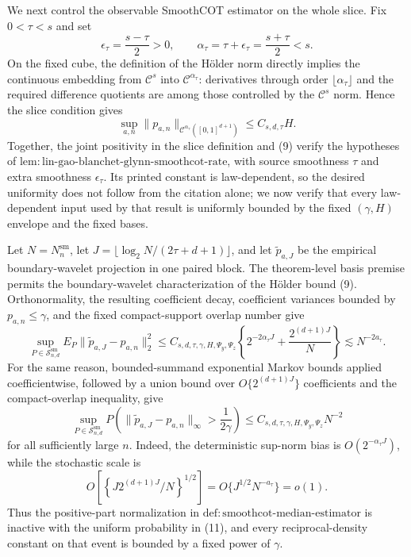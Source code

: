 We next control the observable SmoothCOT estimator on the whole slice.  Fix \(0<\tau<s\) and set
\[
\epsilon_\tau=\frac{s-\tau}{2}>0,
\qquad
\alpha_\tau=\tau+\epsilon_\tau=\frac{s+\tau}{2}<s. \tag{8}
\]
On the fixed cube, the definition of the H\"older norm directly implies the continuous embedding from \(\mathcal C^s\) into \(\mathcal C^{\alpha_\tau}\): derivatives through order \(\lfloor\alpha_\tau\rfloor\) and the required difference quotients are among those controlled by the \(\mathcal C^s\) norm.  Hence the slice condition gives
\[
\sup_{a,n}\|p_{a,n}\|_{\mathcal C^{\alpha_\tau}([0,1]^{d+1})}
\le C_{s,d,\tau}H. \tag{9}
\]
Together, the joint positivity in the slice definition and (9) verify the hypotheses of \(\mathrm{lem{:}lin\text{-}gao\text{-}blanchet\text{-}glynn\text{-}smoothcot\text{-}rate}\), with source smoothness \(\tau\) and extra smoothness \(\epsilon_\tau\).  Its printed constant is law-dependent, so the desired uniformity does not follow from the citation alone; we now verify that every law-dependent input used by that result is uniformly bounded by the fixed \((\gamma,H)\) envelope and the fixed bases.

Let \(N=N_n^{\mathrm{sm}}\), let \(J=\lfloor\log_2N/(2\tau+d+1)\rfloor\), and let \(\widetilde p_{a,J}\) be the empirical boundary-wavelet projection in one paired block.  The theorem-level basis premise permits the boundary-wavelet characterization of the H\"older bound (9).  Orthonormality, the resulting coefficient decay, coefficient variances bounded by \(p_{a,n}\le\gamma\), and the fixed compact-support overlap number give
\[
\sup_{P\in\mathcal S^{\mathrm{sm}}_{n,d}}
E_P\|\widetilde p_{a,J}-p_{a,n}\|_2^2
\le C_{s,d,\tau,\gamma,H,\Psi_y,\Psi_z}
\left\{2^{-2\alpha_\tau J}+\frac{2^{(d+1)J}}{N}\right\}
\lesssim N^{-2a_\tau}. \tag{10}
\]
For the same reason, bounded-summand exponential Markov bounds applied coefficientwise, followed by a union bound over \(O\{2^{(d+1)J}\}\) coefficients and the compact-overlap inequality, give
\[
\sup_{P\in\mathcal S^{\mathrm{sm}}_{n,d}}
P\!\left(\|\widetilde p_{a,J}-p_{a,n}\|_\infty>\frac{1}{2\gamma}\right)
\le C_{s,d,\tau,\gamma,H,\Psi_y,\Psi_z}N^{-2} \tag{11}
\]
for all sufficiently large \(n\).  Indeed, the deterministic sup-norm bias is \(O(2^{-\alpha_\tau J})\), while the stochastic scale is
\[
O\!\left[\left\{J2^{(d+1)J}/N\right\}^{1/2}\right]
=O\{J^{1/2}N^{-a_\tau}\}=o(1).
\]
Thus the positive-part normalization in \(\mathrm{def{:}smoothcot\text{-}median\text{-}estimator}\) is inactive with the uniform probability in (11), and every reciprocal-density constant on that event is bounded by a fixed power of \(\gamma\).

